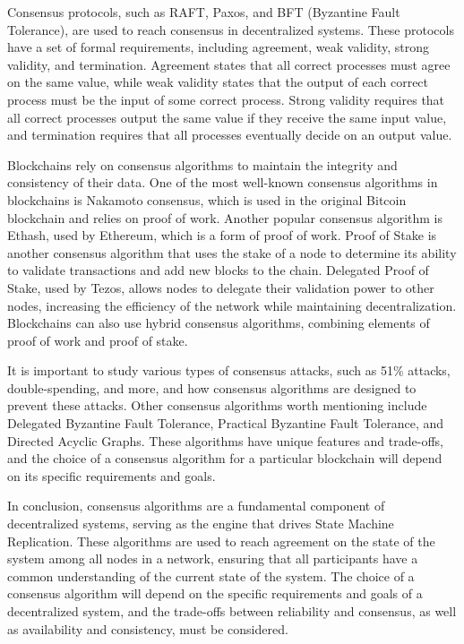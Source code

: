 Consensus protocols, such as RAFT, Paxos, and BFT (Byzantine Fault Tolerance), are used to reach consensus in decentralized systems. These protocols have a set of formal requirements, including agreement, weak validity, strong validity, and termination. Agreement states that all correct processes must agree on the same value, while weak validity states that the output of each correct process must be the input of some correct process. Strong validity requires that all correct processes output the same value if they receive the same input value, and termination requires that all processes eventually decide on an output value.

Blockchains rely on consensus algorithms to maintain the integrity and consistency of their data. One of the most well-known consensus algorithms in blockchains is Nakamoto consensus, which is used in the original Bitcoin blockchain and relies on proof of work. Another popular consensus algorithm is Ethash, used by Ethereum, which is a form of proof of work. Proof of Stake is another consensus algorithm that uses the stake of a node to determine its ability to validate transactions and add new blocks to the chain. Delegated Proof of Stake, used by Tezos, allows nodes to delegate their validation power to other nodes, increasing the efficiency of the network while maintaining decentralization. Blockchains can also use hybrid consensus algorithms, combining elements of proof of work and proof of stake.

It is important to study various types of consensus attacks, such as 51\% attacks, double-spending, and more, and how consensus algorithms are designed to prevent these attacks. Other consensus algorithms worth mentioning include Delegated Byzantine Fault Tolerance, Practical Byzantine Fault Tolerance, and Directed Acyclic Graphs. These algorithms have unique features and trade-offs, and the choice of a consensus algorithm for a particular blockchain will depend on its specific requirements and goals.

In conclusion, consensus algorithms are a fundamental component of decentralized systems, serving as the engine that drives State Machine Replication. These algorithms are used to reach agreement on the state of the system among all nodes in a network, ensuring that all participants have a common understanding of the current state of the system. The choice of a consensus algorithm will depend on the specific requirements and goals of a decentralized system, and the trade-offs between reliability and consensus, as well as availability and consistency, must be considered.




